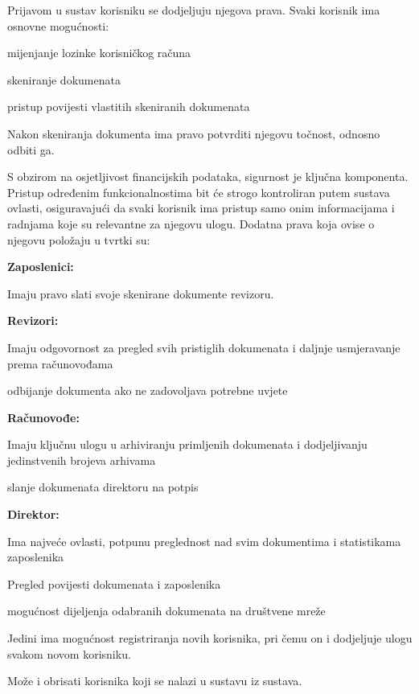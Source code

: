 		Prijavom u sustav korisniku se dodjeljuju njegova prava. Svaki korisnik ima osnovne mogućnosti:
		\begin{packed_item}
			\item mijenjanje lozinke korisničkog računa
			\item skeniranje dokumenata
			\item pristup povijesti vlastitih skeniranih dokumenata
			\item Nakon skeniranja dokumenta ima pravo potvrditi njegovu točnost, odnosno odbiti ga.
		\end{packed_item}
		S obzirom na osjetljivost financijskih podataka, sigurnost je ključna komponenta. Pristup određenim funkcionalnostima bit će strogo kontroliran putem sustava ovlasti,
		 osiguravajući da svaki korisnik ima pristup samo onim informacijama i radnjama koje su relevantne za njegovu ulogu.
		\newline
		Dodatna prava koja ovise o njegovu položaju u tvrtki su:
		\begin{packed_item}
			\item \textbf{Zaposlenici:} 
					\begin{packed_item}
						\item Imaju pravo slati svoje skenirane dokumente revizoru.
					\end{packed_item}
			\item \textbf{Revizori:} 
					\begin{packed_item}
						\item Imaju odgovornost za pregled svih pristiglih dokumenata i daljnje usmjeravanje prema računovođama
						\item odbijanje dokumenta ako ne zadovoljava potrebne uvjete 
					\end{packed_item}
			\item \textbf{Računovođe:} 
						\begin{packed_item}
						\item Imaju ključnu ulogu u arhiviranju primljenih dokumenata i dodjeljivanju jedinstvenih brojeva arhivama
						\item slanje dokumenata direktoru na potpis
					\end{packed_item}
			\item \textbf{Direktor:}
						\begin{packed_item} 
							\item Ima najveće ovlasti, potpunu preglednost nad svim dokumentima i statistikama zaposlenika
							\item Pregled povijesti dokumenata i zaposlenika
							\item mogućnost dijeljenja odabranih dokumenata na društvene mreže
							\item Jedini ima mogućnost registriranja novih korisnika, pri čemu on i dodjeljuje ulogu svakom novom korisniku. 
							\item Može i obrisati korisnika koji se nalazi u sustavu iz sustava.
						\end{packed_item}
		\end{packed_item}
		
